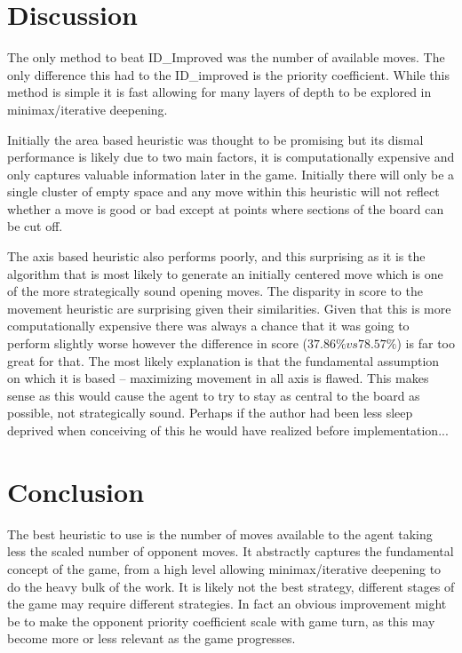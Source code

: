 \documentclass[11pt]{article}
\begin{document}
\section{Discussion}
The only method to beat ID\_Improved was the number of available moves. The only difference this had to the ID\_improved is the priority coefficient. While this method is simple it is fast allowing for many layers of depth to be explored in minimax/iterative deepening.

Initially the area based heuristic was thought to be promising but its dismal performance is likely due to two main factors, it is computationally expensive and only captures valuable information later in the game. Initially there will only be a single cluster of empty space and any move within this heuristic will not reflect whether a move is good or bad except at points where sections of the board can be cut off.

The axis based heuristic also performs poorly, and this surprising as it is the algorithm that is most likely to generate an initially centered move which is one of the more strategically sound opening moves. The disparity in score to the movement heuristic are surprising given their similarities. Given that this is more computationally expensive there was always a chance that it was going to perform slightly worse however the difference in score ($37.86\% vs 78.57\%$) is far too great for that. The most likely explanation is that the fundamental assumption on which it is based -- maximizing movement in all axis is flawed. This makes sense as this would cause the agent to try to stay as central to the board as possible, not strategically sound. Perhaps if the author had been less sleep deprived when conceiving of this he would have realized before implementation...

\section{Conclusion}
The best heuristic to use is the number of moves available to the agent taking less the scaled number of opponent moves. It abstractly captures the fundamental concept of the game, from a high level allowing minimax/iterative deepening to do the heavy bulk of the work. It is likely not the best strategy, different stages of the game may require different strategies. In fact an obvious improvement might be to make the opponent priority coefficient scale with game turn, as this may become more or less relevant as the game progresses.
\end{document}
